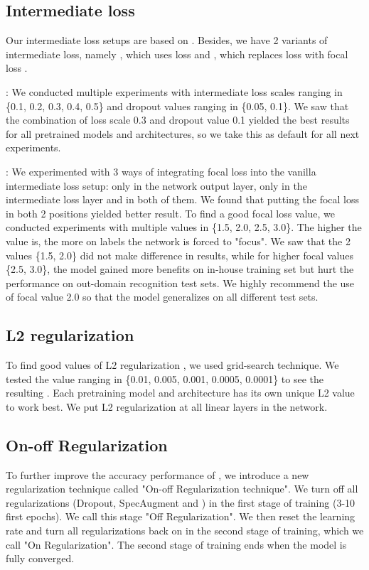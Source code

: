 \subsection{Intermediate loss}
\label{subsec: Intermediate_loss}

Our intermediate loss setups are based on \cite{facebook2020dejavu, zeineldeen2022conformer}. 
Besides, we have 2 variants of intermediate loss, namely , which uses  loss and , which replaces loss with focal loss \cite{focal_loss}.

\textbf{}: We conducted multiple experiments with intermediate loss scales ranging in \{0.1, 0.2, 0.3, 0.4, 0.5\} and dropout \cite{dropout} values ranging in \{0.05, 0.1\}. 
We saw that the combination of loss scale 0.3 and dropout value 0.1 yielded the best results for all pretrained models and architectures, so we take this as default for all next experiments.

\textbf{}: We experimented with 3 ways of integrating focal loss into the vanilla intermediate loss setup: only in the network  output layer, only in the intermediate loss layer and in both of them. 
We found that putting the focal loss in both 2 positions yielded better result.
To find a good focal loss value, we conducted experiments with multiple values in \{1.5, 2.0, 2.5, 3.0\}. 
The higher the value is, the more on labels the network is forced to "focus". 
We saw that the 2 values \{1.5, 2.0\} did not make difference in results, while for higher focal values \{2.5, 3.0\}, the model gained more benefits on in-house training set but hurt the performance on out-domain recognition test sets. 
We highly recommend the use of focal value 2.0 so that the model generalizes on all different test sets.

\subsection{L2 regularization}
\label{subsec: L2_regularization}

To find good values of L2 regularization \cite{L2_regularization}, we used grid-search technique. 
We tested the value ranging in \{0.01, 0.005, 0.001, 0.0005, 0.0001\} to see the resulting .
Each pretraining model and architecture has its own unique L2 value to work best.
We put L2 regularization at all linear layers in the network.

\subsection{On-off Regularization}
\label{subsec: On_off_Regularization}

To further improve the accuracy performance of , we introduce a new regularization technique called "On-off Regularization technique". 
We turn off all regularizations (Dropout, SpecAugment and ) in the first stage of training (3-10 first epochs).
We call this stage "Off Regularization".
We then reset the learning rate and turn all regularizations back on in the second stage of training, which we call "On Regularization".
The second stage of training ends when the model is fully converged.